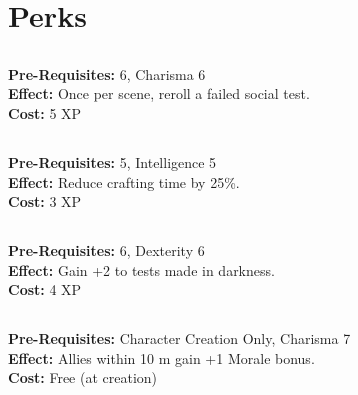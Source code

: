 \documentclass[12pt]{article}
\begin{document}
\section{Perks}
\begin{multicols}{2}




\subsection*{}
\textbf{Pre-Requisites:}  6, Charisma 6\\
\textbf{Effect:} Once per scene, reroll a failed social test.\\
\textbf{Cost:} 5 XP

\medskip

\subsection*{}
\textbf{Pre-Requisites:}  5, Intelligence 5\\
\textbf{Effect:} Reduce crafting time by 25\%.\\
\textbf{Cost:} 3 XP

\medskip

\subsection*{}
\textbf{Pre-Requisites:}  6, Dexterity 6\\
\textbf{Effect:} Gain +2 to  tests made in darkness.\\
\textbf{Cost:} 4 XP

\medskip

\subsection*{}
\textbf{Pre-Requisites:} Character Creation Only, Charisma 7\\
\textbf{Effect:} Allies within 10 m gain +1 Morale bonus.\\
\textbf{Cost:} Free (at creation)


\end{multicols}
\end{document}
